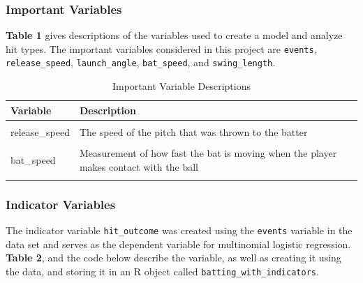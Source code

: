 \documentclass[
  letterpaper,
  DIV=11,
  numbers=noendperiod]{scrartcl}
\begin{document}
\subsubsection{Important Variables}\label{important-variables}

\textbf{Table 1} gives descriptions of the variables used to create a
model and analyze hit types. The important variables considered in this
project are \texttt{events}, \texttt{release\_speed},
\texttt{launch\_angle}, \texttt{bat\_speed}, and \texttt{swing\_length}.

\begin{table}[!h]
\centering
\caption{\label{tab:unnamed-chunk-5}Important Variable Descriptions}
\centering
\begin{tabular}[t]{>{\raggedright\arraybackslash}p{4cm}>{\raggedright\arraybackslash}p{7cm}}
\toprule
Variable & Description\\
\midrule
\cellcolor{gray!10}{events} & \cellcolor{gray!10}{Records the event of the resulting plate appearance (single, double, triple, homerun)}\\
release\_speed & The speed of the pitch that was thrown to the batter\\
\cellcolor{gray!10}{launch\_angle} & \cellcolor{gray!10}{Vertical launch angle of the batted ball as tracked by Statcast. Refers to the angle at which the ball leaves the bat}\\
bat\_speed & Measurement of how fast the bat is moving when the player makes contact with the ball\\
\cellcolor{gray!10}{swing\_length} & \cellcolor{gray!10}{Total amount of feet the bat traveled during the swing (the total distance traveled by the barrel of the bat in x/y/z space)}\\
\bottomrule
\end{tabular}
\end{table}

\subsubsection{Indicator Variables}\label{indicator-variables}

The indicator variable \texttt{hit\_outcome} was created using the
\texttt{events} variable in the data set and serves as the dependent
variable for multinomial logistic regression. \textbf{Table 2}, and the
code below describe the variable, as well as creating it using the data,
and storing it in an R object called \texttt{batting\_with\_indicators}.
\end{document}
